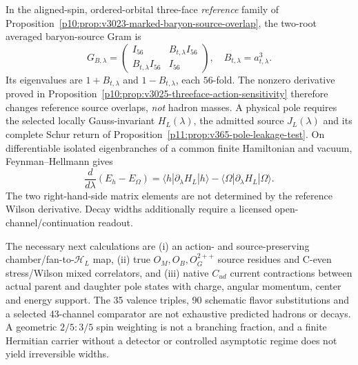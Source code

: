 \documentclass[12pt,a4paper]{article}
\begin{document}
\begin{remark}
\label{p11:rem:v3025-action-sensitive-gram-firewall}
In the aligned-spin, ordered-orbital three-face \emph{reference}
family of
Proposition~\ref{p10:prop:v3023-marked-baryon-source-overlap},
the two-root averaged baryon-source Gram is
\[
 G_{B,\lambda}=\begin{pmatrix}
 I_{56}&B_{t,\lambda}I_{56}\\
 B_{t,\lambda}I_{56}&I_{56}
 \end{pmatrix},\quad
 B_{t,\lambda}=a_{t,\lambda}^3.
\]
Its eigenvalues are $1+B_{t,\lambda}$ and $1-B_{t,\lambda}$,
each $56$-fold.  The nonzero derivative proved in
Proposition~\ref{p10:prop:v3025-threeface-action-sensitivity}
therefore changes reference source overlaps, \emph{not} hadron masses.
A physical pole requires the selected locally Gauss-invariant
$H_L(\lambda)$, the admitted source $J_L(\lambda)$ and its complete
Schur return of
Proposition~\ref{p11:prop:v365-pole-leakage-test}.
On differentiable isolated eigenbranches of a common finite
Hamiltonian and vacuum, Feynman--Hellmann gives
\[
 \frac{d}{d\lambda}(E_h-E_\Omega)
 =\langle h|\partial_\lambda H_L|h\rangle
 -\langle\Omega|\partial_\lambda H_L|\Omega\rangle.
\]
The two right-hand-side matrix elements are not determined by the
reference Wilson derivative.  Decay widths additionally require a
licensed open-channel/continuation readout.
\end{remark}


\begin{remark}
\label{p11:rem:v365-observable-decay-frontier}
The necessary next calculations are (i) an action- and
source-preserving chamber/fan-to-$\mathcal H_L$ map, (ii) true
$O_M,O_B,O_G^{2++}$ source residues and C-even stress/Wilson
mixed correlators, and (iii) native $C_{ud}$ current contractions
between actual parent and daughter pole states with charge,
angular momentum, center and energy support.  The 35 valence
triples, 90 schematic flavor substitutions and a selected
43-channel comparator are not exhaustive predicted hadrons or
decays.  A geometric $2/5:3/5$ spin weighting is not a branching
fraction, and a finite Hermitian carrier without a detector or
controlled asymptotic regime does not yield irreversible widths.
\end{remark}


\end{document}
